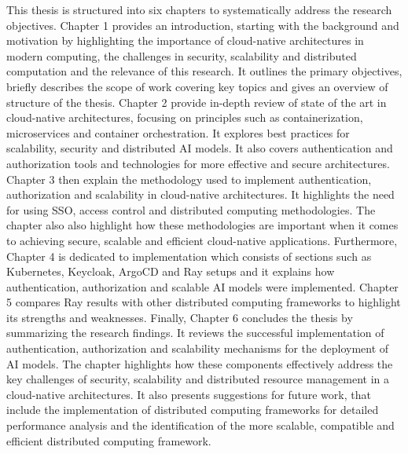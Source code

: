This thesis is structured into six chapters to systematically address the research objectives. Chapter 1 provides an introduction, starting with the background and motivation by highlighting the importance of cloud-native architectures in modern computing, the challenges in security, scalability and distributed computation and the relevance of this research. It outlines the primary objectives, briefly describes the scope of work covering key topics and gives an overview of structure of the thesis. Chapter 2 provide in-depth review of state of the art in cloud-native architectures, focusing on principles such as containerization, microservices and container orchestration. It explores best practices for scalability, security and distributed AI models. It also covers authentication and authorization tools and technologies for more effective and secure architectures. Chapter 3 then explain the methodology used to implement authentication, authorization and scalability in cloud-native architectures. It highlights the need for using SSO, access control and distributed computing methodologies. The chapter also also highlight how these methodologies are important when it comes to achieving secure, scalable and efficient cloud-native applications. Furthermore, Chapter 4 is dedicated to implementation which consists of sections such as Kubernetes, Keycloak, ArgoCD and Ray setups and it explains how authentication, authorization and scalable AI models were implemented. Chapter 5 compares Ray results with other distributed computing frameworks to highlight its strengths and weaknesses. Finally, Chapter 6 concludes the thesis by summarizing the research findings. It reviews the successful implementation of authentication, authorization and scalability mechanisms for the deployment of AI models. The chapter highlights how these components effectively address the key challenges of security, scalability and distributed resource management in a cloud-native architectures. It also presents suggestions for future work, that include the implementation of distributed computing frameworks for detailed performance analysis and the identification of the more scalable, compatible and efficient distributed computing framework.

